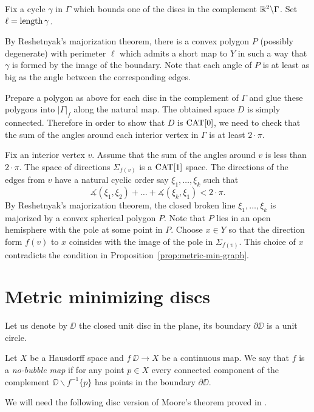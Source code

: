 \documentclass[a4paper,10pt]{amsart}
\begin{document}
Fix a cycle $\gamma$ in $\Gamma$ which bounds one of the discs in the complement $\mathbb{R}^2\backslash \Gamma$.
Set $\ell=\mathop{\rm length}\nolimits\gamma$.

By Reshetnyak's majorization theorem, there is a convex polygon $P$ (possibly degenerate) with perimeter $\ell$ which admits a short map to $Y$ in such a way that $\gamma$ is formed by the image of the boundary.
Note that each angle of $P$ is at least as big as 
the angle between the corresponding edges.

Prepare a polygon as above for each disc in the complement of $\Gamma$
and glue these polygons into $|\Gamma|_f$ along the natural map.
The obtained space $D$ is simply connected.
Therefore in order to show that $D$ is $\mathop{\rm CAT}\nolimits[0]$,
we need to check that the sum of the angles around each interior vertex in $\Gamma$ is at least $2\cdot\pi$.

Fix an interior vertex $v$.
Assume that the sum of the angles around $v$ is less than $2\cdot\pi$.
The space of directions $\Sigma_{f(v)}$ is a $\mathop{\rm CAT}\nolimits[1]$ space.
The directions of the edges from $v$ have a natural
cyclic order say $\xi_1,\dots,\xi_k$
such that
\[\measuredangle(\xi_1,\xi_2)+\dots+\measuredangle(\xi_k,\xi_1)<2\cdot\pi.\]
By Reshetnyak's majorization theorem,
the closed broken line $\xi_1,\dots,\xi_k$ is majorized by a convex spherical polygon $P$.
Note that $P$ lies in an open hemisphere with the pole  at some point in $P$.
Choose $x\in Y$ so that the direction form $f(v)$ to $x$ coinsides with the image of the pole in $\Sigma_{f(v)}$.
This choice of $x$ contradicts the condition in Proposition~\ref{prop:metric-min-graph}.\qeds







\section{Metric minimizing discs}



Let us denote by $\DD$ the closed unit disc in the plane,
its boundary $\partial \DD$ is a unit circle.

Let $X$ be a Hausdorff space and
$f\:\DD\to X$ be a continuous map.
We say that $f$ is a \emph{no-bubble map}
if for any point $p\in X$ every connected component of the complement $\DD\backslash f^{-1}\{p\}$ has points in the boundary $\partial \DD$.


We will need the following disc version of Moore's theorem proved in \cite{moore}.
\end{document}
